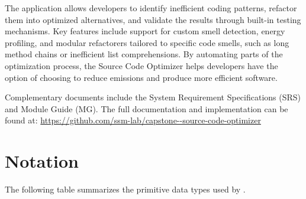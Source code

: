 \documentclass[12pt, titlepage]{article}
\begin{document}
The application allows developers to identify inefficient coding patterns, refactor them into optimized alternatives, and validate the results through built-in testing mechanisms. Key features include support for custom smell detection, energy profiling, and modular refactorers tailored to specific code smells, such as long method chains or inefficient list comprehensions. By automating parts of the optimization process, the Source Code Optimizer helps developers have the option of choosing to reduce emissions and produce more efficient software.

Complementary documents include the System Requirement Specifications (SRS) and Module Guide (MG). The full documentation and implementation can be found at: \url{https://github.com/ssm-lab/capstone--source-code-optimizer}

\section{Notation}

The following table summarizes the primitive data types used by \progname. 
\end{document}
